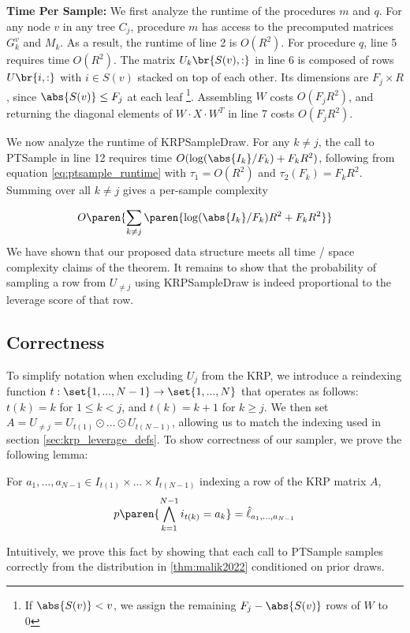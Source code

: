 \textbf{Time Per Sample: } We first analyze the runtime of the 
procedures $m$ and $q$. For any node $v$ in any tree $C_j$, 
procedure $m$ has access to the precomputed matrices $G_k^v$
and $M_k$. As a result, the runtime of line 2 is $O(R^2)$. For procedure
$q$, line 5 requires time $O(R^2)$. The matrix $U_k \br{S(v), :}$ 
in line 6 is composed of rows $U\br{i, :}$ with $i \in S(v)$ 
stacked on top of each other. Its dimensions are $F_j \times R$,
since $\abs{S(v)} \leq F_j$ at each leaf \footnote{If $\abs{S(v)} < v$,
we assign the remaining $F_j - \abs{S(v)}$ rows of $W$ to 0}.
Assembling $W$ costs $O(F_j R^2)$, and returning the
diagonal elements of $W \cdot X \cdot W^T$ in line 7 costs
$O(F_j R^2)$.

We now analyze the runtime of KRPSampleDraw. For any $k \neq j$, the
call to PTSample in line 12 requires time 
$O(\log (\abs{I_k} / F_k) + F_k R^2)$, following from 
equation \ref{eq:ptsample_runtime} with
$\tau_1 = O(R^2)$ and $\tau_2(F_k) = F_k R^2$. Summing over all 
$k \neq j$ gives a per-sample complexity

$$O\paren{\sum_{k \neq j} \paren{\log (\abs{I_k} / F_k)R^2 + F_k R^2}}$$
We have shown that our proposed data structure meets all 
time / space complexity claims of the theorem. It remains to show 
that the probability of sampling a row from $U_{\neq j}$ using
KRPSampleDraw is indeed proportional to the leverage score of that
row.

\subsection{Correctness}
To simplify notation when excluding $U_j$ from the KRP, we 
introduce a reindexing function $t: \set{1,...,N-1} \rightarrow
\set{1, ..., N}$ that operates as follows: $t(k) = k$ for
$1 \leq k < j$, and $t(k) = k+1$ for $k \geq j$. We then set 
$A = U_{\neq j} = U_{t(1)} \odot ... \odot U_{t(N-1)}$, allowing us to match the indexing used in section \ref{sec:krp_leverage_defs}.
To show correctness of our sampler, we prove the following lemma:

\begin{lemma}
    For $a_1, ..., a_{N-1} \in I_{t(1)} \times ... \times 
    I_{t(N-1)}$ indexing a row of the KRP matrix $A$,
    $$p\paren{ \bigwedge_{k=1}^{N-1} i_{t(k)} = a_k} =
    \hat \ell_{a_1, ..., a_{N-1}} 
    $$
    \label{lemma:correctness}
\end{lemma}
Intuitively, we prove this fact by showing that each call
to PTSample samples correctly from the distribution
in \ref{thm:malik2022} conditioned on prior draws. 

